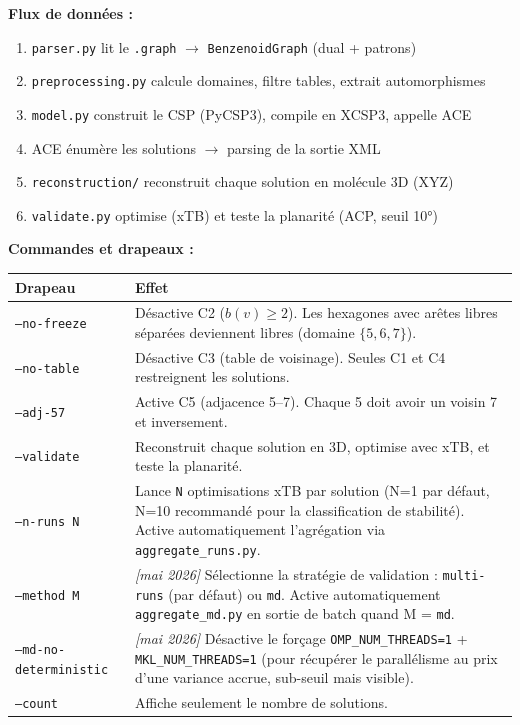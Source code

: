 \documentclass[12pt,a4paper]{article}
\theoremstyle{definition}
\begin{document}
\textbf{Flux de données :}

\begin{enumerate}
  \item \texttt{parser.py} lit le \texttt{.graph} $\to$ \texttt{BenzenoidGraph} (dual + patrons)
  \item \texttt{preprocessing.py} calcule domaines, filtre tables, extrait automorphismes
  \item \texttt{model.py} construit le CSP (PyCSP3), compile en XCSP3, appelle ACE
  \item ACE énumère les solutions $\to$ parsing de la sortie XML
  \item \texttt{reconstruction/} reconstruit chaque solution en molécule 3D (XYZ)
  \item \texttt{validate.py} optimise (xTB) et teste la planarité (ACP, seuil 10°)
\end{enumerate}

\textbf{Commandes et drapeaux :}

\begin{center}
\begin{tabular}{lp{9cm}}
  \toprule
  Drapeau & Effet \\
  \midrule
  \texttt{--no-freeze} & Désactive C2 ($b(v) \geq 2$). Les hexagones avec arêtes libres
    séparées deviennent libres (domaine $\{5, 6, 7\}$). \\
  \texttt{--no-table} & Désactive C3 (table de voisinage). Seules C1 et C4 restreignent
    les solutions. \\
  \texttt{--adj-57} & Active C5 (adjacence 5--7). Chaque 5 doit avoir un voisin 7 et
    inversement. \\
  \texttt{--validate} & Reconstruit chaque solution en 3D, optimise avec xTB, et teste
    la planarité. \\
  \texttt{--n-runs N} & Lance \texttt{N} optimisations xTB par solution (N=1 par défaut,
    N=10 recommandé pour la classification de stabilité). Active automatiquement
    l'agrégation via \texttt{aggregate\_runs.py}. \\
  \texttt{--method M} & \emph{[mai 2026]} Sélectionne la stratégie de validation :
    \texttt{multi-runs} (par défaut) ou \texttt{md}. Active automatiquement
    \texttt{aggregate\_md.py} en sortie de batch quand M = \texttt{md}. \\
  \texttt{--md-no-deterministic} & \emph{[mai 2026]} Désactive le forçage
    \texttt{OMP\_NUM\_THREADS=1} + \texttt{MKL\_NUM\_THREADS=1} (pour récupérer
    le parallélisme au prix d'une variance accrue, sub-seuil mais visible). \\
  \texttt{--count} & Affiche seulement le nombre de solutions. \\
  \bottomrule
\end{tabular}
\end{center}
\end{document}
